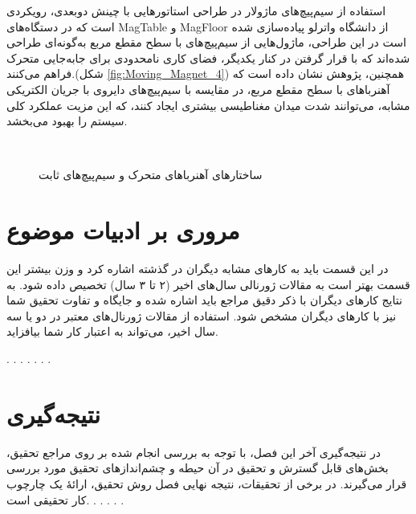 استفاده از سیم‌پیچ‌های ماژولار در طراحی استاتورهایی با چینش دوبعدی، رویکردی است که در دستگاه‌های MagTable و MagFloor از دانشگاه واترلو پیاده‌سازی شده است
\cite{RN8,RN30,RN10}
 در این طراحی، ماژول‌هایی از سیم‌پیچ‌های با سطح مقطع مربع به‌گونه‌ای طراحی شده‌اند که با قرار گرفتن در کنار یکدیگر، فضای کاری نامحدودی برای جابه‌جایی متحرک فراهم می‌کنند.(شکل
\ref{fig:Moving_Magnet_4})
 همچنین، پژوهش
\cite{RN8}
 نشان داده است که آهنرباهای با سطح مقطع مربع، در مقایسه با سیم‌پیچ‌های دایروی با جریان الکتریکی مشابه، می‌توانند شدت میدان مغناطیسی بیشتری ایجاد کنند، که این مزیت عملکرد کلی سیستم را بهبود می‌بخشد.

\begin{figure}[ht]
\centering 
{}
\hspace{2mm}
\\ %
\hspace{2mm}
\label{fig:Moveing_Magnet} %
\caption{ساختارهای آهنرباهای متحرک و سیم‌پیچ‌های ثابت}
\end{figure}








\section{مروری بر ادبیات موضوع}
در این قسمت باید به کارهای مشابه دیگران در گذشته اشاره کرد و وزن بیشتر این قسمت بهتر است به مقالات ژورنالی سال‌های اخیر (۲ تا ۳ سال) تخصیص داده شود. به نتایج کارهای دیگران با ذکر دقیق مراجع باید اشاره شده و جایگاه و تفاوت تحقیق شما نیز با کارهای دیگران مشخص شود. استفاده از مقالات ژورنال‌های معتبر در دو یا سه سال اخیر، می‌تواند به اعتبار کار شما بیافزاید.

.
.
.
.
.
.
.


\section{نتیجه‌گیری}
‌در نتیجه‌گیری آخر این فصل، با توجه به بررسی انجام شده بر روی مراجع تحقیق، بخش‌های قابل گسترش و تحقیق در آن حیطه و چشم‌اندازهای تحقیق مورد بررسی قرار می‌گیرند.	در برخی از تحقیقات، نتیجه نهایی فصل روش تحقیق، ارائهٔ یک چارچوب کار تحقیقی 
است.
.
.
.
.
.